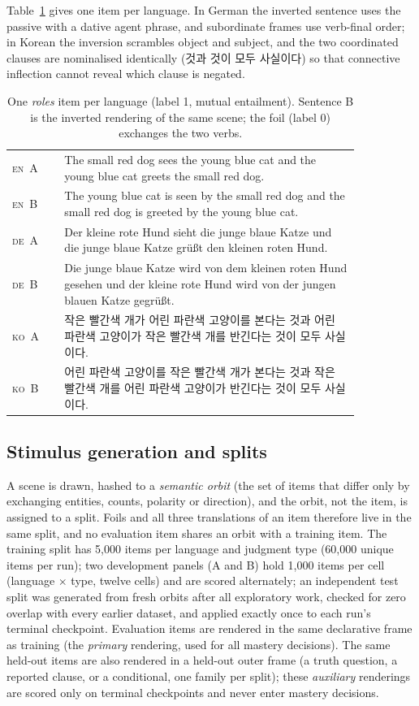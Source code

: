\documentclass[preprint,12pt,authoryear]{elsarticle}
\newcommand{\ko}{\textsc{ko}}
\newcommand{\en}{\textsc{en}}
\newcommand{\de}{\textsc{de}}
\begin{document}
Table~\ref{tab:examples} gives one item per language. In German the inverted sentence uses the passive with a dative agent phrase, and subordinate frames use verb-final order; in Korean the inversion scrambles object and subject, and the two coordinated clauses are nominalised identically ( 것과  것이 모두 사실이다) so that connective inflection cannot reveal which clause is negated.

\begin{table}[t]
\caption{One \emph{roles} item per language (label 1, mutual entailment). Sentence B is the inverted rendering of the same scene; the foil (label 0) exchanges the two verbs.}
\label{tab:examples}
\centering
\small
\begin{tabular}{lp{0.85\linewidth}}
\toprule
\en\ A & The small red dog sees the young blue cat and the young blue cat greets the small red dog. \\
\en\ B & The young blue cat is seen by the small red dog and the small red dog is greeted by the young blue cat. \\
\midrule
\de\ A & Der kleine rote Hund sieht die junge blaue Katze und die junge blaue Katze grüßt den kleinen roten Hund. \\
\de\ B & Die junge blaue Katze wird von dem kleinen roten Hund gesehen und der kleine rote Hund wird von der jungen blauen Katze gegrüßt. \\
\midrule
\ko\ A & 작은 빨간색 개가 어린 파란색 고양이를 본다는 것과 어린 파란색 고양이가 작은 빨간색 개를 반긴다는 것이 모두 사실이다. \\
\ko\ B & 어린 파란색 고양이를 작은 빨간색 개가 본다는 것과 작은 빨간색 개를 어린 파란색 고양이가 반긴다는 것이 모두 사실이다. \\
\bottomrule
\end{tabular}
\end{table}

\subsection{Stimulus generation and splits}

A scene is drawn, hashed to a \emph{semantic orbit} (the set of items that differ only by exchanging entities, counts, polarity or direction), and the orbit, not the item, is assigned to a split. Foils and all three translations of an item therefore live in the same split, and no evaluation item shares an orbit with a training item. The training split has 5{,}000 items per language and judgment type (60{,}000 unique items per run); two development panels (A and B) hold 1{,}000 items per cell (language $\times$ type, twelve cells) and are scored alternately; an independent test split was generated from fresh orbits after all exploratory work, checked for zero overlap with every earlier dataset, and applied exactly once to each run's terminal checkpoint. Evaluation items are rendered in the same declarative frame as training (the \emph{primary} rendering, used for all mastery decisions). The same held-out items are also rendered in a held-out outer frame (a truth question, a reported clause, or a conditional, one family per split); these \emph{auxiliary} renderings are scored only on terminal checkpoints and never enter mastery decisions.
\end{document}
